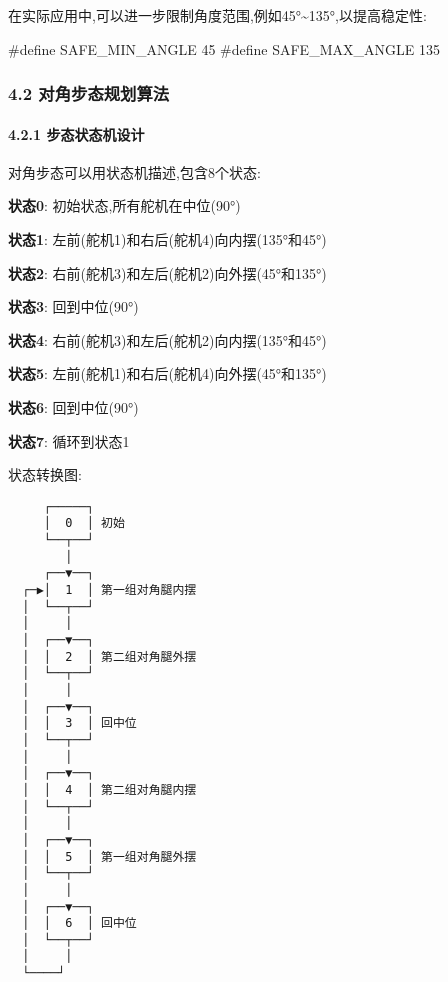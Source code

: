 \documentclass[
]{article}
\newenvironment{Shaded}{}{}
\newcommand{\PreprocessorTok}[1]{\textcolor[rgb]{0.74,0.48,0.00}{#1}}
\begin{document}
在实际应用中,可以进一步限制角度范围,例如45°\textasciitilde135°,以提高稳定性:

\begin{Shaded}
\begin{Highlighting}[]
\PreprocessorTok{\#define SAFE\_MIN\_ANGLE 45}
\PreprocessorTok{\#define SAFE\_MAX\_ANGLE 135}
\end{Highlighting}
\end{Shaded}

\hypertarget{ux5bf9ux89d2ux6b65ux6001ux89c4ux5212ux7b97ux6cd5}{%
\subsubsection{4.2
对角步态规划算法}\label{ux5bf9ux89d2ux6b65ux6001ux89c4ux5212ux7b97ux6cd5}}

\hypertarget{ux6b65ux6001ux72b6ux6001ux673aux8bbeux8ba1}{%
\paragraph{4.2.1
步态状态机设计}\label{ux6b65ux6001ux72b6ux6001ux673aux8bbeux8ba1}}

对角步态可以用状态机描述,包含8个状态:

\textbf{状态0}: 初始状态,所有舵机在中位(90°)

\textbf{状态1}: 左前(舵机1)和右后(舵机4)向内摆(135°和45°)

\textbf{状态2}: 右前(舵机3)和左后(舵机2)向外摆(45°和135°)

\textbf{状态3}: 回到中位(90°)

\textbf{状态4}: 右前(舵机3)和左后(舵机2)向内摆(135°和45°)

\textbf{状态5}: 左前(舵机1)和右后(舵机4)向外摆(45°和135°)

\textbf{状态6}: 回到中位(90°)

\textbf{状态7}: 循环到状态1

状态转换图:

\begin{verbatim}
     ┌─────┐
     │  0  │ 初始
     └──┬──┘
        │
     ┌──▼──┐
  ┌─▶│  1  │ 第一组对角腿内摆
  │  └──┬──┘
  │     │
  │  ┌──▼──┐
  │  │  2  │ 第二组对角腿外摆
  │  └──┬──┘
  │     │
  │  ┌──▼──┐
  │  │  3  │ 回中位
  │  └──┬──┘
  │     │
  │  ┌──▼──┐
  │  │  4  │ 第二组对角腿内摆
  │  └──┬──┘
  │     │
  │  ┌──▼──┐
  │  │  5  │ 第一组对角腿外摆
  │  └──┬──┘
  │     │
  │  ┌──▼──┐
  │  │  6  │ 回中位
  │  └──┬──┘
  │     │
  └────┘
\end{verbatim}
\end{document}
